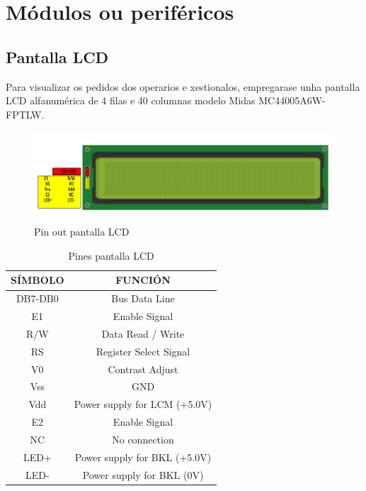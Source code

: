 \documentclass[11pt,twoside]{book}
\begin{document}
\section{Módulos ou periféricos}

\subsection{Pantalla LCD}

Para visualizar os pedidos dos operarios e xestionalos, empregarase unha pantalla LCD alfanumérica de 4 filas e 40 columnas modelo Midas MC44005A6W-FPTLW. \cite{pantalla} 

\begin{figure}[H]
	\begin{center}
		\includegraphics[width=16cm]{images/pinoutPantalla.png}
	\end{center}
	\caption{Pin out pantalla LCD}
	\label{fig:PantallaLCD}
\end{figure}

\begin{table}[H]
\centering
\begin{tabular}{@{}cc@{}}
\textbf{SÍMBOLO} & \textbf{FUNCIÓN}             \\ \midrule
DB7-DB0          & Bus Data Line                \\
E1               & Enable Signal                \\
R/W              & Data Read / Write            \\
RS               & Register Select Signal       \\
V0               & Contrast Adjust              \\
Vss              & GND                          \\
Vdd              & Power supply for LCM (+5.0V) \\
E2               & Enable Signal                \\
NC               & No connection                \\
LED+             & Power supply for BKL (+5.0V) \\
LED-             & Power supply for BKL (0V)    \\ \bottomrule
\end{tabular}
\caption{Pines pantalla LCD}
\label{my-label}
\end{table}
\end{document}
